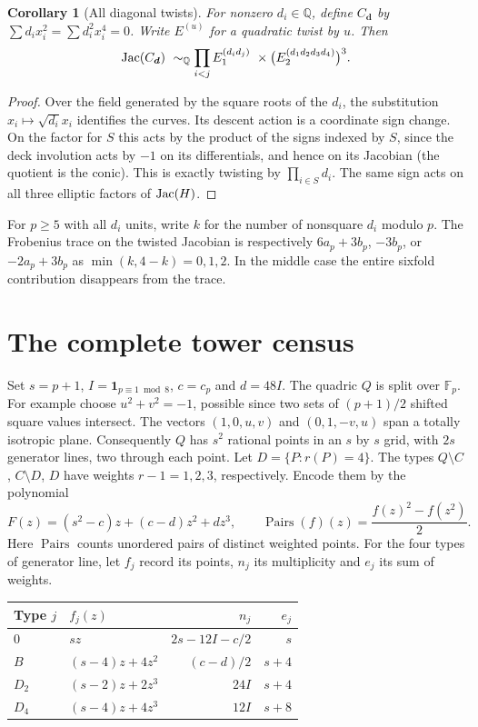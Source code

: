 \documentclass[11pt]{article}
\newtheorem{corollary}[theorem]{Corollary}
\newcommand{\F}{\mathbb F}\newcommand{\Q}{\mathbb Q}\newcommand{\PP}{\mathbb P}
\newcommand{\sq}{\operatorname{Pairs}}
\begin{document}
\begin{corollary}[All diagonal twists]\label{cor:twist}
For nonzero $d_i\in\Q$, define $C_{\boldsymbol d}$ by
$\sum d_i x_i^2=\sum d_i^2 x_i^4=0$. Write $E^{(u)}$ for a
quadratic twist by $u$. Then
\[
 \Jac(C_{\boldsymbol d})\ \sim_{\Q} \prod_{i<j} E_1^{(d_i d_j)}
 \ \times\big(E_2^{(d_1d_2d_3d_4)}\big)^3 .
\]
\end{corollary}
\begin{proof}
Over the field generated by the square roots of the $d_i$, the
substitution $x_i\mapsto\sqrt{d_i}x_i$ identifies the curves.
Its descent action is a coordinate sign change. On the factor for
$S$ this acts by the product of the signs indexed by $S$, since the
deck involution acts by $-1$ on its differentials, and hence on its
Jacobian (the quotient is the conic). This is exactly twisting by
$\prod_{i\in S}d_i$. The same sign acts on all three elliptic factors
of $\operatorname{Jac}(H)$.
\end{proof}
For $p\ge5$ with all $d_i$ units, write $k$ for the number of
nonsquare $d_i$ modulo $p$. The Frobenius trace on the twisted
Jacobian is respectively $6a_p+3b_p$, $-3b_p$, or $-2a_p+3b_p$
as $\min(k,4-k)=0,1,2$. In the middle case the entire sixfold
contribution disappears from the trace.

\section{The complete tower census}
Set $s=p+1$, $I=\mathbf1_{p\equiv1\bmod8}$, $c=c_p$ and $d=48I$.
The quadric $Q$ is split over $\F_p$. For example choose $u^2+v^2=-1$,
possible since two sets of $(p+1)/2$ shifted square values intersect.
The vectors $(1,0,u,v)$ and $(0,1,-v,u)$ span a totally isotropic
plane. Consequently $Q$ has $s^2$ rational points in an $s$ by $s$
grid, with $2s$ generator lines, two through each point. Let
$D=\{P:r(P)=4\}$. The types $Q\setminus C$, $C\setminus D$, $D$
have weights $r-1=1,2,3$, respectively. Encode them by the polynomial
\[
 F(z)=(s^2-c)z+(c-d)z^2+d z^3,\qquad
 \sq(f)(z)=\frac{f(z)^2-f(z^2)}{2}.
\]
Here $\sq$ counts unordered pairs of distinct weighted points.
For the four types of generator line, let $f_j$ record its points,
$n_j$ its multiplicity and $e_j$ its sum of weights.
\begin{center}
\begin{tabular}{@{}llrr@{}}\toprule
Type $j$ & $f_j(z)$ & $n_j$ & $e_j$\\\midrule
$0$ & $sz$ & $2s-12I-c/2$ & $s$\\
$B$ & $(s-4)z+4z^2$ & $(c-d)/2$ & $s+4$\\
$D_2$ & $(s-2)z+2z^3$ & $24I$ & $s+4$\\
$D_4$ & $(s-4)z+4z^3$ & $12I$ & $s+8$\\\bottomrule
\end{tabular}
\end{center}
\end{document}
